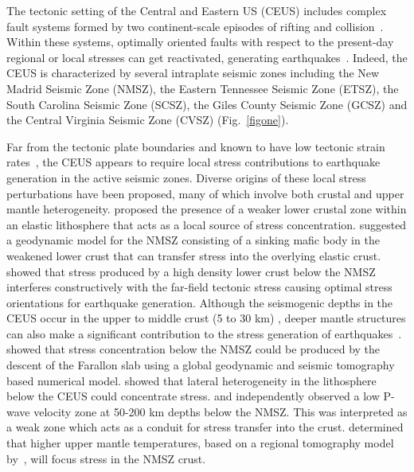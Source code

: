 \documentclass[draft,linenumbers]{agujournal2018}
\begin{document}
    The tectonic setting of the Central and Eastern US (CEUS) includes complex fault systems formed by two continent-scale episodes of rifting and collision~\citep[e.g.,][]{keller1983role, hoffman1989precambrian, thomas2006tectonic}. Within these systems, optimally oriented faults with respect to the present-day regional or local stresses can get reactivated, generating earthquakes~\citep[e.g.,][]{zoback1992stress, hurd2012intraplate}. Indeed, the CEUS is characterized by several intraplate seismic zones including the New Madrid Seismic Zone (NMSZ), the Eastern Tennessee Seismic Zone (ETSZ), the South Carolina Seismic Zone (SCSZ), the Giles County Seismic Zone (GCSZ) and the Central Virginia Seismic Zone (CVSZ) (Fig.~\ref{figone}). 
    
    Far from the tectonic plate boundaries and known to have low tectonic strain rates~\citep{Boyd_2015}, the CEUS appears to require local stress contributions to earthquake generation in the active seismic zones. Diverse origins of these local stress perturbations have been proposed, many of which involve both crustal and upper mantle heterogeneity. \citet{Kenner_2000a} proposed the presence of a weaker lower crustal zone within an elastic lithosphere that acts as a local source of stress concentration. \citet{Pollitz_2001} suggested a geodynamic model for the NMSZ consisting of a sinking mafic body in the weakened lower crust that can transfer stress into the overlying elastic crust. \citet{levandowski2016dense} showed that stress produced by a high density lower crust below the NMSZ interferes constructively with the far-field tectonic stress causing optimal stress orientations for earthquake generation.  Although the seismogenic depths in the CEUS occur in the upper to middle crust (5 to 30 km) \citep{vlahovic1998et1d, johnston1996seismic, mazzotti2010state}, deeper mantle structures can also make a significant contribution to the stress generation of  earthquakes~\citep[e.g.,][]{forte2007descent, li2007stress, chen2014crust, nyamwandha2016joint, zhan2016stress}. \citet{forte2007descent} showed that stress concentration below the NMSZ could be produced by the descent of the Farallon slab using a global geodynamic and seismic tomography based numerical model. \citet{li2007stress} showed that lateral heterogeneity in the lithosphere below the CEUS could concentrate stress. \citet{chen2014crust} and \citet{nyamwandha2016joint} independently observed a low P-wave velocity zone at 50-200 km depths below the NMSZ. This was interpreted as a weak zone which acts as a conduit for stress transfer into the crust. \citet{zhan2016stress} determined that higher upper mantle temperatures, based on a regional tomography model by~\citet{pollitz2014seismic}, will focus stress in the NMSZ crust.
    
\end{document}
